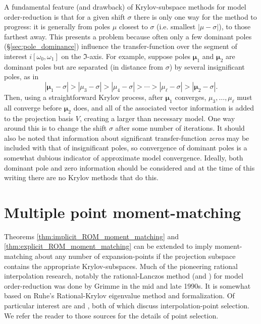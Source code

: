   A fundamental feature (and drawback) of Krylov-subspace  methods for model order-reduction is that for a given shift $\sigma$ there is only one way for the method to progress: it is generally from poles $\mu$ closest to $\sigma$ (i.e. smallest $|\mu - \sigma|$), to those farthest away.   This presents a problem because often only a few  dominant poles (\S\ref{sec:pole_dominance}) influence the transfer-function over the segment of interest $i [\omega_0,\omega_1]$ on the $\Im$-axis.  For example, suppose poles $\bm{\mu}_1$ and $\bm{\mu}_2$ are dominant poles but are separated (in distance from $\sigma$) by several insignificant poles,  as in 
\[
| \bm{\mu}_1  -\sigma| >| \mu_3 - \sigma| > |\mu_4-\sigma| > \cdots > |\mu_\ell-\sigma| >
|\bm{\mu}_2-\sigma|. 
\]
 Then, using a straightforward Krylov process, after $\bm{\mu}_1$ converges,  $\mu_3,\ldots,\mu_\ell$  must all converge before $\bm{\mu}_2$ does, and all of the associated vector information is added to the projection basis $V$, creating a larger than necessary model.      One way around this is to change the shift $\sigma$ after some number of iterations.    It should also be noted that information about significant transfer-function \emph{zeros} may be included with that of insignificant poles, so convergence of dominant poles is a somewhat dubious indicator of approximate model convergence.  Ideally, both dominant pole and zero information should be considered and at the time of this writing there are no Krylov methods that do this.




\section{Multiple point moment-matching}
Theorems \ref{thm:implicit_ROM_moment_matching} and  \ref{thm:explicit_ROM_moment_matching} can be extended to imply moment-matching about any number of expansion-points  if the projection subspace  contains the appropriate Krylov-subspaces.    Much of the pioneering rational interpolation research, notably the rational-Lanczos method \cite{gallivan1996rational} (and \cite{grimme1997krylovratinterp}) for model order-reduction was done by Grimme in the mid and late 1990s.  It is somewhat based on Ruhe's Rational-Krylov \cite{ruhe1984, ruhe1994rational} eigenvalue method and formalization.   Of particular interest are  \cite{grimme1998rational} and \cite{druskin2011adaptive}, both of which discuss interpolation-point selection.  We refer the reader to those sources for the details of point selection.

